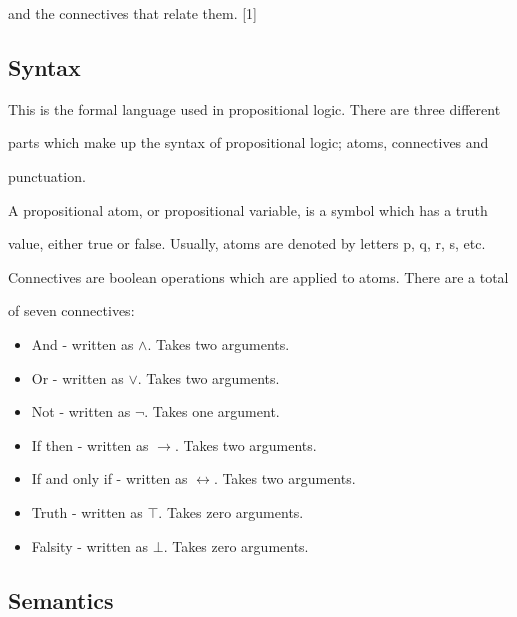 \documentclass{report}
\begin{document}
and the connectives that relate them. [1]



\subsection{Syntax}

This is the formal language used in propositional logic. There are three different

parts which make up the syntax of propositional logic; atoms, connectives and

punctuation.



A propositional atom, or propositional variable, is a symbol which has a truth

value, either true or false. Usually, atoms are denoted by letters p, q, r, s, etc.



Connectives are boolean operations which are applied to atoms. There are a total

of seven connectives:



\begin{itemize}

	\item And - written as $\land$. Takes two arguments.

	\item Or - written as $\lor$. Takes two arguments.

	\item Not - written as $\neg$. Takes one argument.

	\item If then - written as $\to$. Takes two arguments.

	\item If and only if - written as $\leftrightarrow$. Takes two arguments.

	\item Truth - written as $\top$. Takes zero arguments.

	\item Falsity - written as $\bot$. Takes zero arguments.

\end{itemize}



\subsection{Semantics}
\end{document}
